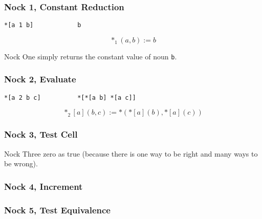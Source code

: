 \subsubsection[Nock 1]{Nock 1, Constant Reduction}

\begin{lstlisting}[style=nonumbers]
*[a 1 b]            b
\end{lstlisting}

$$
*_{1}(a,b) := b
$$

Nock One simply returns the constant value of noun \texttt{b}.

\subsubsection[Nock 2]{Nock 2, Evaluate}

\begin{lstlisting}[style=nonumbers]
*[a 2 b c]          *[*[a b] *[a c]]
\end{lstlisting}

$$
*_{2}[a](b,c) := *({*[a](b)}, {*[a](c)})
$$

\subsubsection[Nock 3]{Nock 3, Test Cell}


Nock Three
zero as true (because there is one way to be right and many ways to be wrong).

\subsubsection[Nock 4]{Nock 4, Increment}
\subsubsection[Nock 5]{Nock 5, Test Equivalence}

